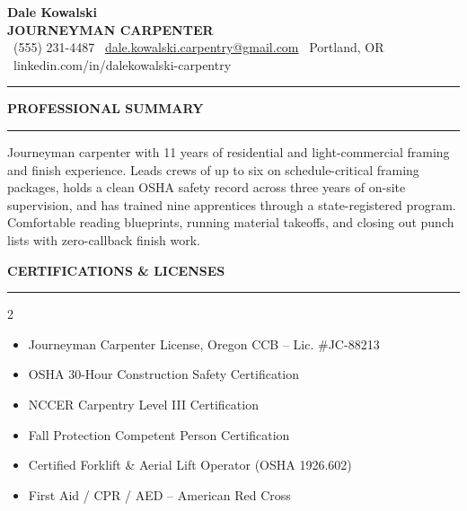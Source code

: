 \documentclass[10pt]{article}
\newcommand{\sectionrule}[1]{%
  \vspace{2pt}
  {\color{primary}\bfseries\large #1}\\[-4pt]
  {\color{accent}\rule{\linewidth}{1.3pt}}
  \vspace{0pt}
}
\begin{document}
\begin{center}
  {\color{primary}\fontsize{23}{25}\selectfont\bfseries Dale Kowalski}\\[2pt]
  {\color{accent}\large\bfseries JOURNEYMAN CARPENTER}\\[3pt]
  {\color{graytext}\small
    \faPhone\ (555) 231-4487 \quad\textbullet\quad
    \faEnvelope\ \href{mailto:dale.kowalski.carpentry@gmail.com}{dale.kowalski.carpentry@gmail.com} \quad\textbullet\quad
    \faMapMarker\ Portland, OR \quad\textbullet\quad
    \faLinkedin\ linkedin.com/in/dalekowalski-carpentry
  }
\end{center}

{\color{rulegray}\rule{\linewidth}{0.6pt}}

\sectionrule{PROFESSIONAL SUMMARY}
Journeyman carpenter with 11 years of residential and light-commercial framing and finish experience. Leads crews of up to six on schedule-critical framing packages, holds a clean OSHA safety record across three years of on-site supervision, and has trained nine apprentices through a state-registered program. Comfortable reading blueprints, running material takeoffs, and closing out punch lists with zero-callback finish work.

\sectionrule{CERTIFICATIONS \& LICENSES}
\begin{tcolorbox}[colback=lightbg, colframe=rulegray, boxrule=0.5pt, arc=1.5pt, left=8pt, right=8pt, top=3pt, bottom=3pt]
\begin{multicols}{2}
\begin{itemize}
  \item[\faCertificate] Journeyman Carpenter License, Oregon CCB \mbox{--} Lic. \#JC-88213
  \item[\faCertificate] OSHA 30-Hour Construction Safety Certification
  \item[\faCertificate] NCCER Carpentry Level III Certification
  \item[\faCertificate] Fall Protection Competent Person Certification
  \item[\faCertificate] Certified Forklift \& Aerial Lift Operator (OSHA 1926.602)
  \item[\faCertificate] First Aid / CPR / AED \mbox{--} American Red Cross
\end{itemize}
\end{multicols}
\end{tcolorbox}
\end{document}

